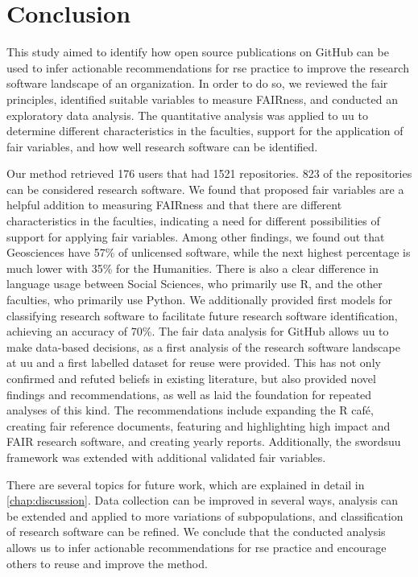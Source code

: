 \chapter{Conclusion}
\label{chap:conclusion}
This study aimed to identify how open source publications on GitHub can be used to infer actionable recommendations for \acrshort{rse} practice to improve the research software landscape of an organization. 
In order to do so, we reviewed the \acrshort{fair} principles, identified suitable variables to measure FAIRness, and conducted an exploratory data analysis.
The quantitative analysis was applied to \acrshort{uu} to determine different characteristics in the faculties, support for the application of \acrshort{fair} variables, and how well research software can be identified. 

Our method retrieved 176 users that had 1521 repositories. 823 of the repositories can be considered research software.
We found that proposed \acrshort{fair} variables are a helpful addition to measuring FAIRness and that there are different characteristics in the faculties, indicating a need for different possibilities of support for applying \acrshort{fair} variables. 
Among other findings, we found out that Geosciences have 57\% of unlicensed software, while the next highest percentage is much lower with 35\% for the Humanities. There is also a clear difference in language usage between Social Sciences, who primarily use R, and the other faculties, who primarily use Python.
We additionally provided first models for classifying research software to facilitate future research software identification, achieving an accuracy of 70\%.
The \acrshort{fair} data analysis for GitHub allows \acrshort{uu} to make data-based decisions, as a first analysis of the research software landscape at \acrshort{uu} and a first labelled dataset for reuse were provided.
This has not only confirmed and refuted beliefs in existing literature, but also provided novel findings and recommendations, as well as laid the foundation for repeated analyses of this kind. The recommendations include expanding the R café, creating \acrshort{fair} reference documents, featuring and highlighting high impact and FAIR research software, and creating yearly reports.
Additionally, the \acrshort{swordsuu} framework was extended with additional validated  \acrshort{fair} variables. 

There are several topics for future work, which are explained in detail in \autoref{chap:discussion}. Data collection can be improved in several ways, analysis can be extended and applied to more variations of subpopulations, and classification of research software can be refined.
We conclude that the conducted analysis allows us to infer actionable recommendations for \acrshort{rse} practice and encourage others to reuse and improve the method.